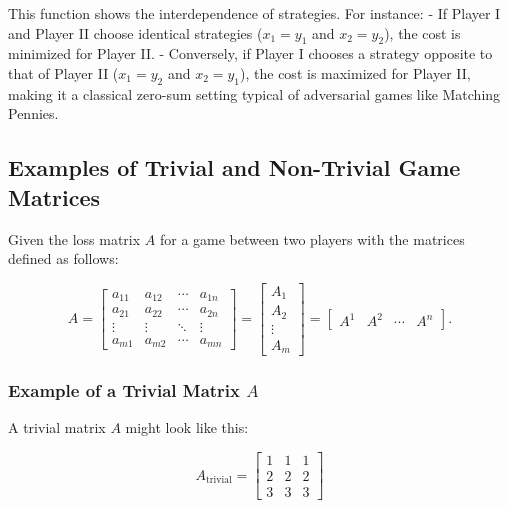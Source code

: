 \documentclass[11pt]{article}
\theoremstyle{boldStyle}
\begin{document}
This function shows the interdependence of strategies. For instance:
- If Player I and Player II choose identical strategies (\( x_1 = y_1 \) and \( x_2 = y_2 \)), the cost is minimized for Player II.
- Conversely, if Player I chooses a strategy opposite to that of Player II (\( x_1 = y_2 \) and \( x_2 = y_1 \)), the cost is maximized for Player II, making it a classical zero-sum setting typical of adversarial games like Matching Pennies.


\subsection{Examples of Trivial and Non-Trivial Game Matrices}

Given the loss matrix \( A \) for a game between two players with the matrices defined as follows:

\begin{equation*} \label{eq:3}
    A = \begin{bmatrix}
    a_{11} & a_{12} & \cdots & a_{1n} \\
    a_{21} & a_{22} & \cdots & a_{2n} \\
    \vdots & \vdots & \ddots & \vdots \\
    a_{m1} & a_{m2} & \cdots & a_{mn}
    \end{bmatrix} = \begin{bmatrix} A_1 \\ A_2 \\ \vdots \\ A_m \end{bmatrix} = \begin{bmatrix} A^1 & A^2 & \cdots & A^n \end{bmatrix}.
\end{equation*}

\subsubsection{Example of a Trivial Matrix \( A \)}

A trivial matrix \( A \) might look like this:

\begin{equation*} \label{eq:trivial}
    A_{\text{trivial}} = \begin{bmatrix}
    1 & 1 & 1 \\
    2 & 2 & 2 \\
    3 & 3 & 3
    \end{bmatrix}
\end{equation*}
\end{document}
